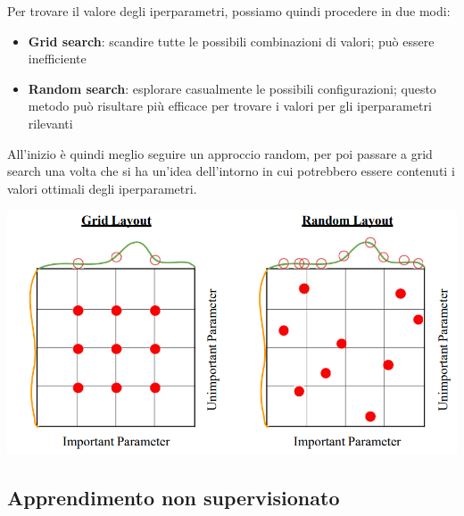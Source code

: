 \documentclass[12pt]{article}
\begin{document}
Per trovare il valore degli iperparametri, possiamo quindi procedere in due modi: 
\begin{itemize}
    \item \textbf{Grid search}: scandire tutte le possibili combinazioni di valori; può essere inefficiente
    \item \textbf{Random search}: esplorare casualmente le possibili configurazioni; questo metodo può risultare più efficace per trovare i valori per gli iperparametri rilevanti
\end{itemize}
All'inizio è quindi meglio seguire un approccio random, per poi passare a grid search una volta che si ha un'idea dell'intorno in cui potrebbero essere contenuti i valori ottimali degli iperparametri.
\begin{center}
    \includegraphics[width =1\linewidth]{Images/181.PNG}
\end{center}
\newpage
\subsection{Apprendimento non supervisionato}
\end{document}
